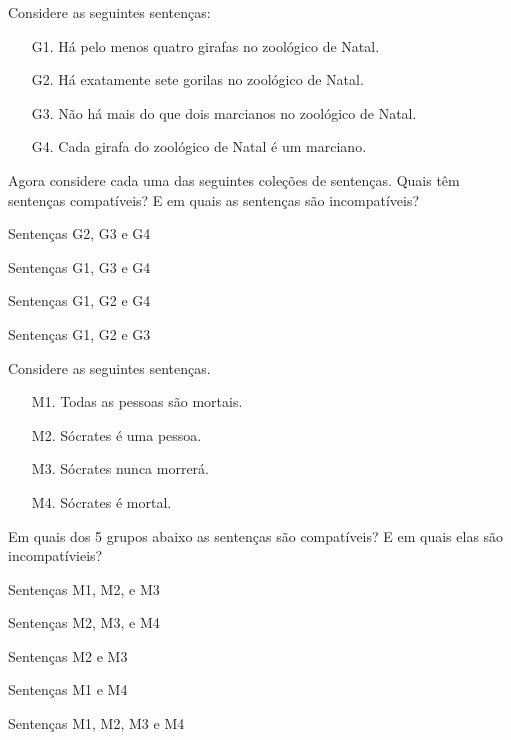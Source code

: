 \noindent \problempart Considere as seguintes sentenças: 
\begin{enumerate}%
\item[G1.] \label{itm:at_least_four} Há pelo menos quatro girafas no zoológico de Natal.
\item[G2.] \label{itm:exactly_seven} Há exatamente sete gorilas no zoológico de Natal.
\item[G3.] \label{itm:not_more_than_two} Não há mais do que dois marcianos no zoológico de Natal.
\item[G4.] \label{itm:martians} Cada girafa do zoológico de Natal é um marciano.
\end{enumerate}

Agora considere cada uma das seguintes coleções de sentenças. Quais têm sentenças compatíveis? E em quais as sentenças são incompatíveis?
\begin{earg}
\item Sentenças G2, G3 e G4
\item Sentenças G1, G3 e G4
\item Sentenças G1, G2 e G4
\item Sentenças G1, G2 e G3
\end{earg}

\problempart Considere as seguintes sentenças.
\begin{enumerate}%
\item[M1.] \label{itm:allmortal} Todas as pessoas são mortais.
\item[M2.] \label{itm:socperson} Sócrates é uma pessoa.
\item[M3.] \label{itm:socnotdie} Sócrates nunca morrerá.
\item[M4.] \label{itm:socmortal} Sócrates é mortal.
\end{enumerate}
Em quais dos 5 grupos abaixo as sentenças são compatíveis? E em quais elas são incompatívieis?
\begin{earg}
\item Sentenças M1, M2, e M3
\item Sentenças M2, M3, e M4
\item Sentenças M2 e M3
\item Sentenças M1 e M4
\item Sentenças M1, M2, M3 e M4
\end{earg}

